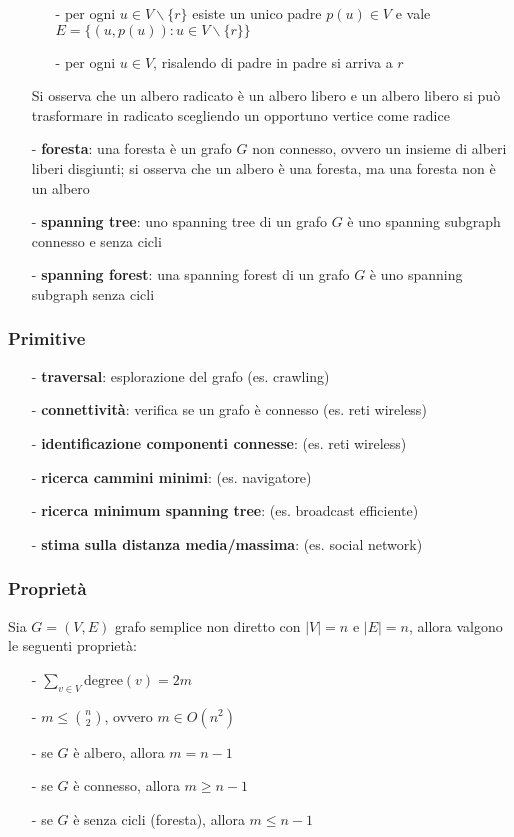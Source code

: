 \documentclass[a4paper]{article}
\begin{document}
\begin{itemize}[topsep=3pt, itemsep=0pt]
\begin{itemize}[topsep=0pt, itemsep=0pt]
		\item[-] per ogni \(u \in V \backslash \{r\}\) esiste un unico padre \(p(u) \in V\) e vale \(E = \{(u,p(u)) : u \in V \backslash \{r\}\}\)
		\item[-] per ogni \(u \in V\), risalendo di padre in padre si arriva a \(r\)
	\end{itemize}
	\item[] Si osserva che un albero radicato è un albero libero e un albero libero si può trasformare in radicato scegliendo
	un opportuno vertice come radice
	\item[-] \textbf{foresta}: una foresta è un grafo \(G\) non connesso, ovvero un insieme di alberi liberi disgiunti; si
	osserva che un albero è una foresta, ma una foresta non è un albero
	\item[-] \textbf{spanning tree}: uno spanning tree di un grafo \(G\) è uno spanning subgraph connesso e senza cicli
	\item[-] \textbf{spanning forest}: una spanning forest di un grafo \(G\) è uno spanning subgraph senza cicli
\end{itemize}

\subsubsection*{Primitive}
\begin{itemize}[topsep=3pt, itemsep=0pt]
	\item[-] \textbf{traversal}: esplorazione del grafo (es. crawling)
	\item[-] \textbf{connettività}: verifica se un grafo è connesso (es. reti wireless)
	\item[-] \textbf{identificazione componenti connesse}: (es. reti wireless)
	\item[-] \textbf{ricerca cammini minimi}: (es. navigatore)
	\item[-] \textbf{ricerca minimum spanning tree}: (es. broadcast efficiente)
	\item[-] \textbf{stima sulla distanza media/massima}: (es. social network)
\end{itemize}

\subsubsection*{Proprietà}
Sia \(G = (V,E)\) grafo semplice non diretto con \(|V| = n\) e \(|E| = n\), allora valgono le seguenti proprietà:
\begin{itemize}[topsep=3pt, itemsep=0pt]
	\item[-] \(\displaystyle \sum_{v \in V} \text{degree}(v) = 2m\)
	\item[-] \(m \leq \binom{n}{2}\), ovvero \(m \in O(n^2)\)
	\item[-] se \(G\) è albero, allora \(m = n - 1\)
	\item[-] se \(G\) è connesso, allora \(m \geq n-1\)
	\item[-] se \(G\) è senza cicli (foresta), allora \(m \leq n-1\)
\end{itemize}
\end{document}
